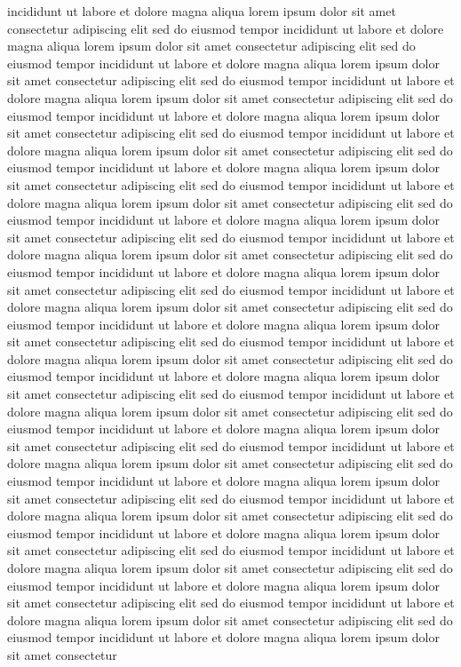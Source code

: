 \documentclass{article}
\begin{document}
incididunt ut labore et dolore magna aliqua lorem ipsum dolor sit amet
consectetur adipiscing elit sed do eiusmod tempor incididunt ut labore et
dolore magna aliqua lorem ipsum dolor sit amet consectetur adipiscing elit
sed do eiusmod tempor incididunt ut labore et dolore magna aliqua lorem
ipsum dolor sit amet consectetur adipiscing elit sed do eiusmod tempor
incididunt ut labore et dolore magna aliqua lorem ipsum dolor sit amet
consectetur adipiscing elit sed do eiusmod tempor incididunt ut labore et
dolore magna aliqua lorem ipsum dolor sit amet consectetur adipiscing elit
sed do eiusmod tempor incididunt ut labore et dolore magna aliqua lorem
ipsum dolor sit amet consectetur adipiscing elit sed do eiusmod tempor
incididunt ut labore et dolore magna aliqua lorem ipsum dolor sit amet
consectetur adipiscing elit sed do eiusmod tempor incididunt ut labore et
dolore magna aliqua lorem ipsum dolor sit amet consectetur adipiscing elit
sed do eiusmod tempor incididunt ut labore et dolore magna aliqua lorem
ipsum dolor sit amet consectetur adipiscing elit sed do eiusmod tempor
incididunt ut labore et dolore magna aliqua lorem ipsum dolor sit amet
consectetur adipiscing elit sed do eiusmod tempor incididunt ut labore et
dolore magna aliqua lorem ipsum dolor sit amet consectetur adipiscing elit
sed do eiusmod tempor incididunt ut labore et dolore magna aliqua lorem
ipsum dolor sit amet consectetur adipiscing elit sed do eiusmod tempor
incididunt ut labore et dolore magna aliqua lorem ipsum dolor sit amet
consectetur adipiscing elit sed do eiusmod tempor incididunt ut labore et
dolore magna aliqua lorem ipsum dolor sit amet consectetur adipiscing elit
sed do eiusmod tempor incididunt ut labore et dolore magna aliqua lorem
ipsum dolor sit amet consectetur adipiscing elit sed do eiusmod tempor
incididunt ut labore et dolore magna aliqua lorem ipsum dolor sit amet
consectetur adipiscing elit sed do eiusmod tempor incididunt ut labore et
dolore magna aliqua lorem ipsum dolor sit amet consectetur adipiscing elit
sed do eiusmod tempor incididunt ut labore et dolore magna aliqua lorem
ipsum dolor sit amet consectetur adipiscing elit sed do eiusmod tempor
incididunt ut labore et dolore magna aliqua lorem ipsum dolor sit amet
consectetur adipiscing elit sed do eiusmod tempor incididunt ut labore et
dolore magna aliqua lorem ipsum dolor sit amet consectetur adipiscing elit
sed do eiusmod tempor incididunt ut labore et dolore magna aliqua lorem
ipsum dolor sit amet consectetur adipiscing elit sed do eiusmod tempor
incididunt ut labore et dolore magna aliqua lorem ipsum dolor sit amet
consectetur adipiscing elit sed do eiusmod tempor incididunt ut labore et
dolore magna aliqua lorem ipsum dolor sit amet consectetur adipiscing elit
sed do eiusmod tempor incididunt ut labore et dolore magna aliqua lorem
ipsum dolor sit amet consectetur adipiscing elit sed do eiusmod tempor
incididunt ut labore et dolore magna aliqua lorem ipsum dolor sit amet
consectetur
\end{document}
